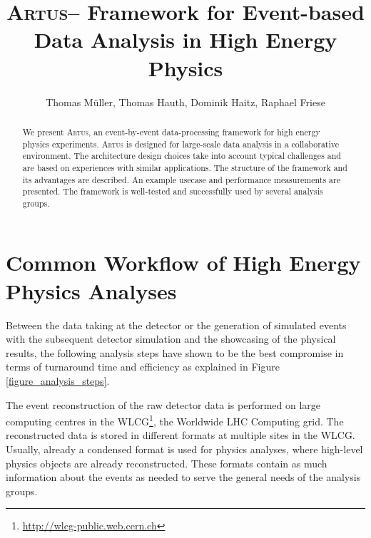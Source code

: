 \documentclass[3p]{elsarticle}
\newcommand{\software}[1]{\textsc{#1}\xspace}
\newcommand{\artus}{\software{Artus}}
\begin{document}
\begin{frontmatter}
\title{\artus -- Framework for Event-based Data Analysis in High Energy Physics}

\author[kit]{Thomas M\"uller, Thomas Hauth, Dominik Haitz, Raphael Friese}
\address[kit]{Karlsruhe Institute of Technology, Wolfgang-Gaede-Stra\ss{}e 1, D-76131 Karlsruhe}

\begin{abstract}
We present \artus, an event-by-event data-processing framework for high energy physics experiments.
\artus is designed for large-scale data analysis in a collaborative environment.
The architecture design choices take into account typical challenges and are based on experiences with similar applications.
The structure of the framework and its advantages are described.
An example usecase and performance measurements are presented.
The framework is well-tested and successfully used by several analysis groups.
\end{abstract}

\end{frontmatter}


\section{Common Workflow of High Energy Physics Analyses \label{section_artus_analysis_workflow}}

Between the data taking at the detector or the generation of simulated events with the subsequent detector simulation and the showcasing of the physical results, the following analysis steps have shown to be the best compromise in terms of turnaround time and efficiency as explained in Figure \ref{figure_analysis_steps}.

The event reconstruction of the raw detector data is performed on large computing centres in the WLCG\footnote{\url{http://wlcg-public.web.cern.ch}}, the Worldwide LHC Computing grid.
The reconstructed data is stored in different formats at multiple sites in the WLCG.
Usually, already a condensed format is used for physics analyses, where high-level physics objects are already reconstructed.
These formats contain as much information about the events as needed to serve the general needs of the analysis groups.
\end{document}
